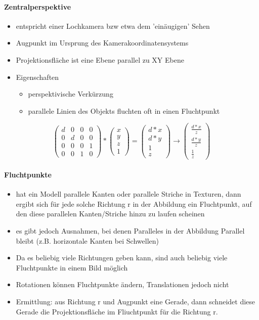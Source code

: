 \documentclass[10pt,landscape]{article}
\begin{document}
\begin{multicols}{3}
\paragraph{Zentralperspektive}
\begin{itemize}
  \item entspricht einer Lochkamera bzw etwa dem 'einäugigen' Sehen
  \item Augpunkt im Ursprung des Kamerakoordinatensystems
  \item Projektionsfläche ist eine Ebene parallel zu XY Ebene
  \item Eigenschaften
        \begin{itemize}
          \item perspektivische Verkürzung
          \item parallele Linien des Objekts fluchten oft in einen Fluchtpunkt
        \end{itemize}
\end{itemize}
$$\begin{pmatrix} d&0&0&0\\ 0&d&0&0 \\ 0&0&0&1 \\ 0&0&1&0 \end{pmatrix} * \begin{pmatrix}x\\y\\z\\1\end{pmatrix} = \begin{pmatrix} d*x\\ d*y\\ 1 \\ z \end{pmatrix} \rightarrow \begin{pmatrix} \frac{d*x}{z} \\ \frac{d*y}{z} \\ \frac{1}{z} \end{pmatrix}$$

\paragraph{Fluchtpunkte}
\begin{itemize}
  \item hat ein Modell parallele Kanten oder parallele Striche in Texturen, dann ergibt sich für jede solche Richtung r in der Abbildung ein Fluchtpunkt, auf den diese parallelen Kanten/Striche hinzu zu laufen scheinen
  \item es gibt jedoch Ausnahmen, bei denen Paralleles in der Abbildung Parallel bleibt (z.B. horizontale Kanten bei Schwellen)
  \item Da es beliebig viele Richtungen geben kann, sind auch beliebig viele Fluchtpunkte in einem Bild möglich
  \item Rotationen können Fluchtpunkte ändern, Translationen jedoch nicht
  \item Ermittlung: aus Richtung r und Augpunkt eine Gerade, dann schneidet diese Gerade die Projektionsfläche im Fliuchtpunkt für die Richtung r.
\end{itemize}


\end{multicols}
\end{document}
